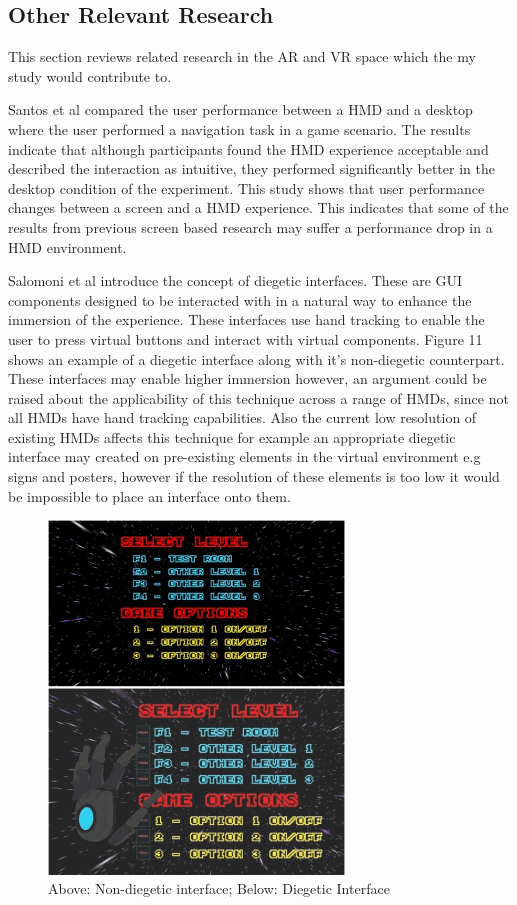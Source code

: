 \documentclass{article}
\begin{document}
\subsection{Other Relevant Research}
This section reviews related research in the AR and VR space which the my study would contribute to. 

Santos et al \cite{SousaSantos2008} compared the user performance between a HMD and a desktop where the user performed a navigation task in a game scenario. The results indicate that although participants found the HMD experience acceptable and described the interaction as intuitive, they performed significantly better in the desktop condition of the experiment. This study shows that user performance changes between a screen and a HMD experience. This indicates that some of the results from previous screen based research \cite{Grasset6402555} may suffer a performance drop in a HMD environment. 


Salomoni et al \cite{Salomoni2017} introduce the concept of diegetic interfaces. These are GUI components designed to be interacted with in a natural way to enhance the immersion of the experience. These interfaces use hand tracking to enable the user to press virtual buttons and interact with virtual components. Figure 11 shows an example of a diegetic interface along with it's non-diegetic counterpart. These interfaces may enable higher immersion however, an argument could be raised about the applicability of this technique across a range of HMDs, since not all HMDs have hand tracking capabilities. Also the current low resolution of existing HMDs affects this technique for example an appropriate diegetic interface may created on pre-existing elements in the virtual environment e.g signs and posters, however if the resolution of these elements is too low it would be impossible to place an interface onto them. 

\begin{figure}[htbp]
		\hspace{0.15\textwidth}
        \includegraphics[width=0.7\textwidth]{Images/digetic.jpg}
    	\caption{ Above: Non-diegetic interface; Below: Diegetic Interface \cite{Salomoni2017}
}
\end{figure}
\end{document}

